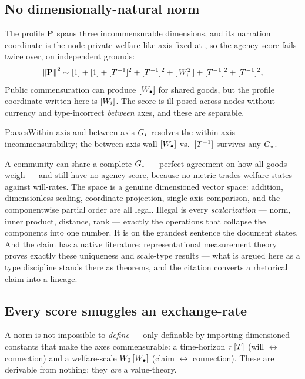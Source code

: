 \documentclass[../main]{subfiles}
\begin{document}
\subsection{No dimensionally-natural norm}
\label{subsec:prof:nonorm}
%
\begin{theorem}
  The profile $\mathbf{P}$ spans three incommensurable dimensions, and its narration coordinate
  is the node-private welfare-like axis fixed at , so the agency-score fails twice
  over, on independent grounds:
  \begin{equation}
    \left\lVert \mathbf{P} \right\rVert^2\sim[1]+[1]+[T\sp{-1}]\sp{2}+[T\sp{-1}]\sp{2}
      +[\,W\sb{i}\sp{2}\,]+[T\sp{-1}]\sp{2}+[T\sp{-1}]\sp{2},
    \label{eq:P:nonorm-expand}
  \end{equation}
  Public commensuration can produce $[W\sb{\bullet}]$ for shared goods, but the profile coordinate
  written here is $[W\sb{i}]$. The score is ill-posed across nodes without currency
  and type-incorrect \emph{between} axes, and these are separable.
\end{theorem}

\begin{statement}{P:axes}{Within-axis and between-axis}
  $G\sb{\star}$ resolves the within-axis incommensurability; the between-axis wall
  $[W\sb{\bullet}]$ vs.\ $[T\sp{-1}]$ survives any $G\sb{\star}$.
\end{statement}

A community can share a complete $G\sb{\star}$ --- perfect agreement on how all goods weigh
--- and still have no agency-score, because no metric trades welfare-states against
will-rates. The space is a genuine dimensioned vector space: addition, dimensionless scaling,
coordinate projection, single-axis comparison, and the componentwise partial order are all
legal. Illegal is every \emph{scalarization} --- norm, inner product, distance, rank ---
exactly the operations that collapse the components into one number. It is  on
the grandest sentence the document states. And the claim has a native literature:
representational measurement theory \parencite{a:kls} proves exactly these uniqueness and
scale-type results --- what is argued here as a type discipline stands there as theorems, and the
citation converts a rhetorical claim into a lineage.

\subsection{Every score smuggles an exchange-rate}
\label{subsec:prof:leak}
%
A norm is not impossible to \emph{define} --- only definable by importing dimensioned
constants that make the axes commensurable: a time-horizon $\tau\,[T]$ (will
$\leftrightarrow$ connection) and a welfare-scale $W\sb{0}\,[W\sb{\bullet}]$ (claim $\leftrightarrow$
connection). These are derivable from nothing; they \emph{are} a value-theory.
\end{document}
